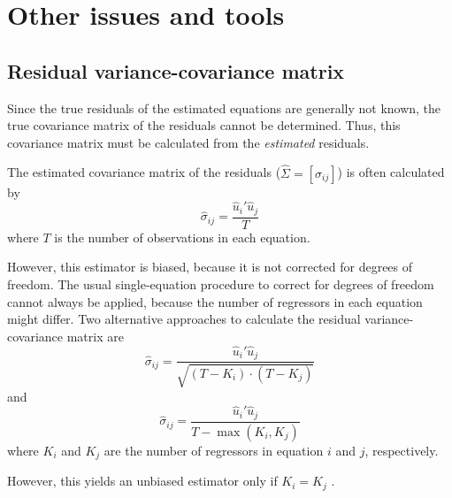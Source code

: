 \section{Other issues and tools}\label{sec:Other}


\subsection{Residual variance-covariance matrix}\label{sec:residcov}

Since the true residuals of the estimated equations are generally not known,
the true covariance matrix of the residuals cannot be determined.
Thus, this covariance matrix must be calculated from the
\emph{estimated} residuals. 

The estimated covariance matrix of the residuals ($\widehat{\Sigma} = 
\left[ \widehat{\sigma}_{ij} \right]$) 
is often calculated by
\begin{equation}
   \widehat{\sigma}_{ij} = \frac{ \widehat{u}_i' \widehat{u}_j }{ T }
   \label{eq:rcov0}
\end{equation}
where $T$ is the number of observations in each equation.

However, this estimator is biased, because it is not corrected for 
degrees of freedom. 
The usual single-equation procedure to correct for degrees of freedom 
cannot always be applied, because the number of regressors in each equation 
might differ.
Two alternative approaches to calculate the residual variance-covariance 
matrix are
\begin{equation}
   \widehat{\sigma}_{ij} = \frac{ \widehat{u}_i' \widehat{u}_j }
   { \sqrt{ \left( T - K_i \right) \cdot \left( T - K_j \right) } }
   \label{eq:rcov1}
\end{equation}
and
\begin{equation}
   \widehat{\sigma}_{ij} = \frac{ \widehat{u}_i' \widehat{u}_j }
   { T - \max \left( K_i , K_j \right) }
\end{equation}
where $K_i$ and $K_j$ are the number of regressors in equation
$i$ and $j$, respectively.

However, this yields an unbiased estimator only if $K_i = K_j$ 
\citep[p. 469]{judge85}. 


